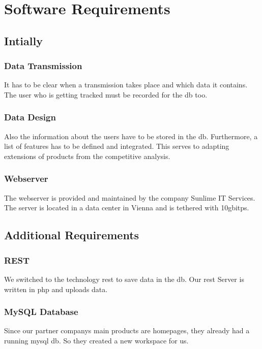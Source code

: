 \chapter{Software Requirements}
\section{Intially}
\subsection{Data Transmission}
It has to be clear when a transmission takes place and which data it contains. The user who is getting tracked must be recorded for the \gls{db} too.
\subsection{Data Design}
Also the information about the users have to be stored in the \gls{db}. Furthermore, a list of features has to be defined and integrated. This serves to adapting extensions of products from the competitive analysis.
\subsection{Webserver}
The webserver is provided and maintained by the company Sunlime IT Services. The server is located in a data center in Vienna and is tethered with 10\gls{gbitps}.
\section{Additional Requirements}
\subsection{REST}
We switched to the technology \gls{rest} to save data in the \gls{db}. Our \gls{rest} Server is written in \gls{php} and uploads data.
\subsection{MySQL Database}
Since our partner companys main products are homepages, they already had a running \gls{mysql} \gls{db}. So they created a new workspace for us.


